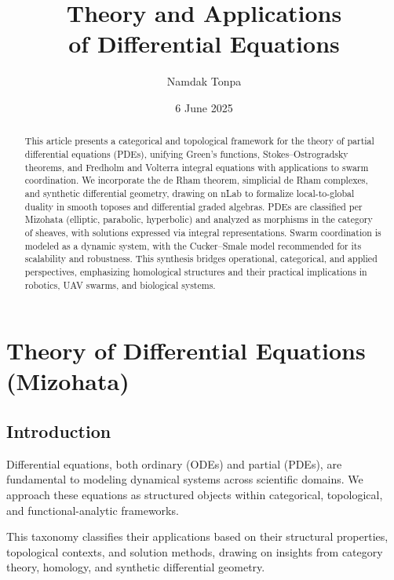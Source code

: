 \documentclass{article}
\theoremstyle{plain}
\begin{document}
\title{Theory and Applications \\ of Differential Equations}
\author{Namdak Tonpa}
\date{6 June 2025}
\maketitle

\begin{abstract}
This article presents a categorical and topological framework for the theory
of partial differential equations (PDEs), unifying Green's functions,
Stokes--Ostrogradsky theorems, and Fredholm and Volterra integral
equations with applications to swarm coordination. We incorporate
the de Rham theorem, simplicial de Rham complexes,
and synthetic differential geometry, drawing on nLab to formalize
local-to-global duality in smooth toposes and differential graded algebras.
PDEs are classified per Mizohata (elliptic, parabolic, hyperbolic) and
analyzed as morphisms in the category of sheaves, with solutions expressed
via integral representations. Swarm coordination is modeled as a dynamic
system, with the Cucker--Smale model recommended for its scalability and
robustness. This synthesis bridges operational, categorical, and applied
perspectives, emphasizing homological structures and their practical
implications in robotics, UAV swarms, and biological systems.
\end{abstract}


\tableofcontents

\section{Theory of Differential Equations (Mizohata)}

\subsection{Introduction}

Differential equations, both ordinary (ODEs) and partial (PDEs),
are fundamental to modeling dynamical systems across scientific domains.
We approach these equations as structured objects within categorical,
topological, and functional-analytic frameworks.

This taxonomy classifies their applications based on their structural properties,
topological contexts, and solution methods, drawing on insights from category theory,
homology, and synthetic differential geometry.
\end{document}
